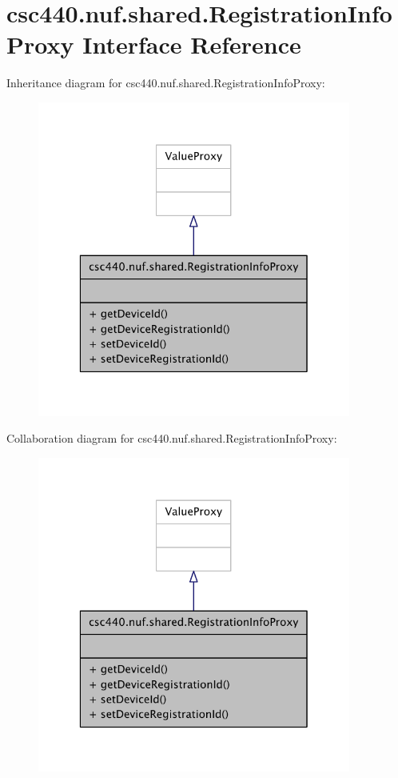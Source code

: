 \hypertarget{interfacecsc440_1_1nuf_1_1shared_1_1_registration_info_proxy}{\section{csc440.\-nuf.\-shared.\-Registration\-Info\-Proxy Interface Reference}
\label{interfacecsc440_1_1nuf_1_1shared_1_1_registration_info_proxy}
}


Inheritance diagram for csc440.\-nuf.\-shared.\-Registration\-Info\-Proxy\-:
\nopagebreak
\begin{figure}[H]
\begin{center}
\leavevmode
\includegraphics[width=292pt]{interfacecsc440_1_1nuf_1_1shared_1_1_registration_info_proxy__inherit__graph}
\end{center}
\end{figure}


Collaboration diagram for csc440.\-nuf.\-shared.\-Registration\-Info\-Proxy\-:
\nopagebreak
\begin{figure}[H]
\begin{center}
\leavevmode
\includegraphics[width=292pt]{interfacecsc440_1_1nuf_1_1shared_1_1_registration_info_proxy__coll__graph}
\end{center}
\end{figure}
